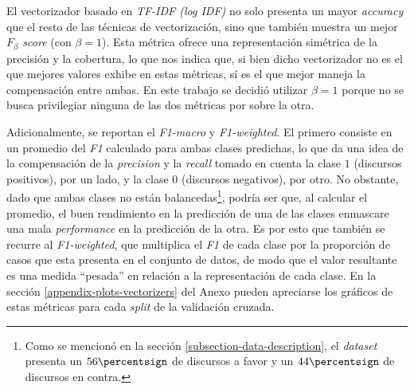 El vectorizador basado en \textit{TF-IDF (log IDF)} no solo presenta un mayor
\textit{accuracy} que el resto de las t\'ecnicas de vectorizaci\'on, sino que
tambi\'en muestra un mejor \textit{$F_{\beta}$ score} (con $\beta=1$).
Esta m\'etrica ofrece una representaci\'on sim\'etrica de la precisi\'on y la cobertura,
lo que nos indica que, si bien dicho vectorizador no es el que mejores valores
exhibe en estas m\'etricas, s\'i es el que mejor maneja la compensaci\'on
entre ambas. En este trabajo se decidi\'o utilizar $\beta=1$ porque no se busca
privilegiar ninguna de las dos m\'etricas por sobre la otra.
\par
Adicionalmente, se reportan el \textit{F1-macro} y \textit{F1-weighted}.
El primero consiste en un promedio del \textit{F1} calculado para ambas clases
predichas, lo que da una idea de la compensaci\'on de la \textit{precision} y la
\textit{recall} tomado en cuenta la clase $1$ (discursos positivos), por un lado, y
la clase $0$ (discursos negativos), por otro. No obstante, dado que ambas clases no
est\'an balancedas\footnote{Como se mencion\'o en la secci\'on
\ref{subsection-data-description}, el \textit{dataset} presenta un $56\percentsign$
de discursos a favor y un $44\percentsign$ de discursos en contra.}, podr\'ia ser que,
al calcular el promedio, el buen rendimiento en la predicci\'on de una de las clases
enmascare una mala \textit{performance} en la predicci\'on de la otra. Es por esto
que tambi\'en se recurre al \textit{F1-weighted}, que multiplica el \textit{F1}
de cada clase por la proporci\'on de casos que esta presenta en el conjunto de datos,
de modo que el valor resultante es una medida ``pesada'' en relaci\'on a la representaci\'on
de cada clase. En la secci\'on \ref{appendix-plots-vectorizers} del Anexo pueden
apreciarse los gr\'aficos de estas m\'etricas para cada \textit{split} de la validaci\'on
cruzada.
